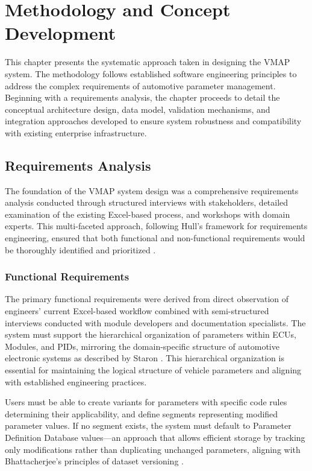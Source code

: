 \chapter{Methodology and Concept Development}
\label{chap:methodology}

This chapter presents the systematic approach taken in designing the \ac{VMAP} system. The methodology follows established software engineering principles to address the complex requirements of automotive parameter management. Beginning with a requirements analysis, the chapter proceeds to detail the conceptual architecture design, data model, validation mechanisms, and integration approaches developed to ensure system robustness and compatibility with existing enterprise infrastructure.

\section{Requirements Analysis}
\label{sec:requirements-analysis}

The foundation of the \ac{VMAP} system design was a comprehensive requirements analysis conducted through structured interviews with stakeholders, detailed examination of the existing Excel-based process, and workshops with domain experts. This multi-faceted approach, following Hull's framework for requirements engineering, ensured that both functional and non-functional requirements would be thoroughly identified and prioritized \cite{hull2010requirements}.

\subsection{Functional Requirements}
\label{subsec:functional-requirements}

The primary functional requirements were derived from direct observation of engineers' current Excel-based workflow combined with semi-structured interviews conducted with module developers and documentation specialists. The system must support the hierarchical organization of parameters within \acp{ECU}, Modules, and \acp{PID}, mirroring the domain-specific structure of automotive electronic systems as described by Staron \cite{staron2021automotive}. This hierarchical organization is essential for maintaining the logical structure of vehicle parameters and aligning with established engineering practices.

Users must be able to create variants for parameters with specific code rules determining their applicability, and define segments representing modified parameter values. If no segment exists, the system must default to Parameter Definition Database values—an approach that allows efficient storage by tracking only modifications rather than duplicating unchanged parameters, aligning with Bhattacherjee's principles of dataset versioning \cite{bhattacherjee2015principles}.

